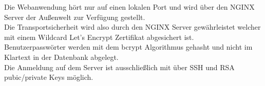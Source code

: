 \documentclass[landscape,a0paper,fontscale=0.35]{baposter} %
\begin{document}
\begin{poster}
{\begin{center}
\end{center}
Die Webanwendung hört nur auf einen lokalen Port und wird über den NGINX Server der Außenwelt zur Verfügung gestellt.\\
Die Transportsicherheit wird also durch den NGINX Server gewährleistet welcher mit einem Wildcard Let's Encrypt Zertifikat abgesichert ist.\\
Benutzerpasswörter werden mit dem bcrypt Algorithmus gehasht und nicht im Klartext in der Datenbank abgelegt.\\
Die Anmeldung auf dem Server ist ausschließlich mit über SSH und RSA pubic/private Keys möglich. 
\\

}


%
%
%


%
%



\end{poster}
\end{document}
